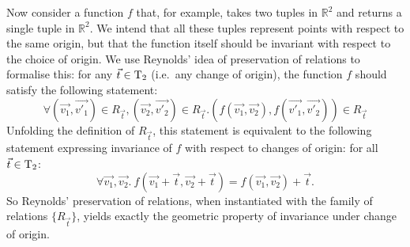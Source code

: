 Now consider a function $f$ that, for example, takes two tuples in
$\mathbb{R}^2$ and returns a single tuple in $\mathbb{R}^2$. We intend
that all these tuples represent points with respect to the same
origin, but that the function itself should be invariant with respect
to the choice of origin. We use Reynolds' idea of preservation of
relations to formalise this: for any $\vec{t} \in \mathrm{T}_2$ (i.e.~any
change of origin), the function $f$ should satisfy the following
statement:
\begin{equation}\label{eq:f-preserve-rel-frame}
  \forall (\vec{v_1},\vec{v'_1}) \in R_{\vec{t}}, (\vec{v_2},\vec{v'_2}) \in R_{\vec{t}}. (f(\vec{v_1}, \vec{v_2}), f(\vec{v'_1}, \vec{v'_2})) \in R_{\vec{t}}
\end{equation}
Unfolding the definition of $R_{\vec{t}}$, this statement is
equivalent to the following statement expressing invariance of $f$
with respect to changes of origin: for all $\vec{t} \in \mathrm{T}_2$:
\begin{equation}\label{eq:f-invariant-frame}
  \forall \vec{v_1}, \vec{v_2}.\ f(\vec{v_1} + \vec{t},\vec{v_2} + \vec{t}) = f(\vec{v_1},\vec{v_2}) + \vec{t}.
\end{equation}
So Reynolds' preservation of relations, when instantiated with the
family of relations $\{R_{\vec{t}}\}$, yields exactly the geometric
property of invariance under change of origin.

